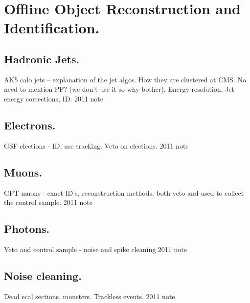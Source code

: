 \chapter{Offline Object Reconstruction and Identification.} %
\label{cha:offline_object_deffinitions}

\section{Hadronic Jets.} %
\label{sec:hadronic_jets}
AK5 calo jets -- explanation of the jet algos. How they are clustered at CMS.
No need to mention PF? (we don't use it so why bother). Energy resolution, Jet 
energy corrections, ID. 2011 note



\section{Electrons.} %
\label{sec:electrons}
GSF elections - ID, use tracking. Veto on elections. 2011 note

\section{Muons.} %
\label{sec:muons}
GPT muons - exact ID's, reconstruction methods. both veto and used to collect 
the control sample. 2011 note

\section{Photons.} %
\label{sec:photons}
Veto and control sample - noise and spike cleaning 2011 note

\section{Noise cleaning.} %
\label{sec:noise_cleaning}
Dead ecal sections.
monsters.
Trackless events.
2011 note.


